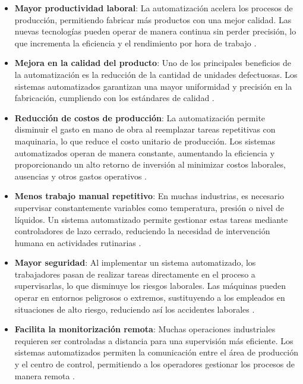 \begin{itemize}

 \item \textbf{Mayor productividad laboral}: La automatización acelera los procesos de producción, permitiendo fabricar más productos con una mejor calidad. Las nuevas tecnologías pueden operar de manera continua sin perder precisión, lo que incrementa la eficiencia y el rendimiento por hora de trabajo  \cite{des_ventajas_1}.

 \item \textbf{Mejora en la calidad del producto}: Uno de los principales beneficios de la automatización es la reducción de la cantidad de unidades defectuosas. Los sistemas automatizados garantizan una mayor uniformidad y precisión en la fabricación, cumpliendo con los estándares de calidad \cite{des_ventajas_2}.
   
\item \textbf{Reducción de costos de producción}: La automatización permite disminuir el gasto en mano de obra al reemplazar tareas repetitivas con maquinaria, lo que reduce el costo unitario de producción. Los sistemas automatizados operan de manera constante, aumentando la eficiencia y proporcionando un alto retorno de inversión al minimizar costos laborales, ausencias y otros gastos operativos \cite{des_ventajas_1}.

\item \textbf{Menos trabajo manual repetitivo}: En muchas industrias, es necesario supervisar constantemente variables como temperatura, presión o nivel de líquidos. Un sistema automatizado permite gestionar estas tareas mediante controladores de lazo cerrado, reduciendo la necesidad de intervención humana en actividades rutinarias \cite{des_ventajas_1}.

\item \textbf{Mayor seguridad}: Al implementar un sistema automatizado, los trabajadores pasan de realizar tareas directamente en el proceso a supervisarlas, lo que disminuye los riesgos laborales. Las máquinas pueden operar en entornos peligrosos o extremos, sustituyendo a los empleados en situaciones de alto riesgo, reduciendo así los accidentes laborales \cite{des_ventajas_2}.

\item \textbf{Facilita la monitorización remota}: Muchas operaciones industriales requieren ser controladas a distancia para una supervisión más eficiente. Los sistemas automatizados permiten la comunicación entre el área de producción y el centro de control, permitiendo a los operadores gestionar los procesos de manera remota \cite{des_ventajas_2}.

\end{itemize}

